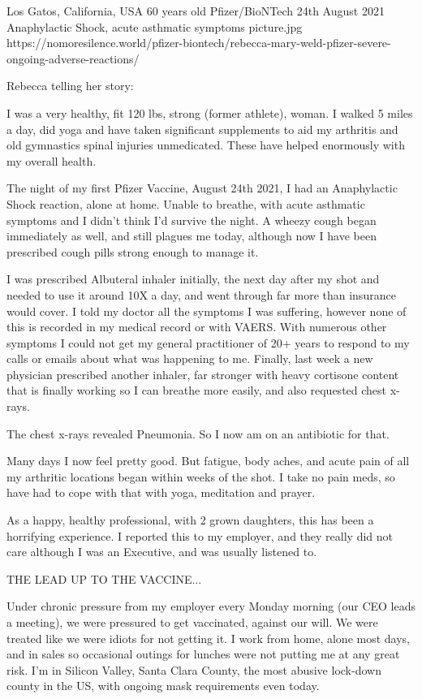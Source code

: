{Los Gatos, California, USA}
{60 years old}
{Pfizer/BioNTech}
{24th August 2021}
{Anaphylactic Shock, acute asthmatic symptoms}
{picture.jpg}
{https://nomoresilence.world/pfizer-biontech/rebecca-mary-weld-pfizer-severe-ongoing-adverse-reactions/}
{

\normalsize

Rebecca telling her story:

I was a very healthy, fit 120 lbs, strong (former athlete), woman. I walked 5
miles a day, did yoga and have taken significant supplements to aid my arthritis
and old gymnastics spinal injuries unmedicated. These have helped enormously
with my overall health.

The night of my first Pfizer Vaccine, August 24th 2021, I had an Anaphylactic
Shock reaction, alone at home. Unable to breathe, with acute asthmatic symptoms
and I didn’t think I’d survive the night. A wheezy cough began immediately as
well, and still plagues me today, although now I have been prescribed cough
pills strong enough to manage it.

I was prescribed Albuteral inhaler initially, the next day after my shot and
needed to use it around 10X a day, and went through far more than insurance
would cover. I told my doctor all the symptoms I was suffering, however none of
this is recorded in my medical record or with VAERS. With numerous other
symptoms I could not get my general practitioner of 20+ years to respond to my
calls or emails about what was happening to me. Finally, last week a new
physician prescribed another inhaler, far stronger with heavy cortisone content
that is finally working so I can breathe more easily, and also requested chest
x-rays.

The chest x-rays revealed Pneumonia. So I now am on an antibiotic for that.

Many days I now feel pretty good. But fatigue, body aches, and acute pain of all
my arthritic locations began within weeks of the shot. I take no pain meds, so
have had to cope with that with yoga, meditation and prayer.

As a happy, healthy professional, with 2 grown daughters, this has been a
horrifying experience. I reported this to my employer, and they really did not
care although I was an Executive, and was usually listened to.

THE LEAD UP TO THE VACCINE...

Under chronic pressure from my employer every Monday morning (our CEO leads a
meeting), we were pressured to get vaccinated, against our will. We were treated
like we were idiots for not getting it. I work from home, alone most days, and
in sales so occasional outings for lunches were not putting me at any great
risk. I’m in Silicon Valley, Santa Clara County, the most abusive lock-down
county in the US, with ongoing mask requirements even today.

}
